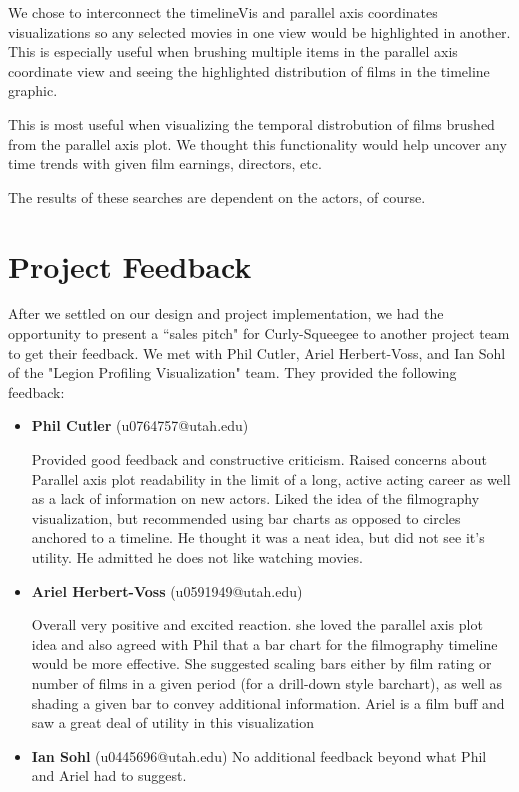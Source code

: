 \documentclass[12pt]{article}
\begin{document}
We chose to interconnect the timelineVis and parallel axis coordinates visualizations so any selected movies in one view would be highlighted in another.  This is especially useful when brushing multiple items in the parallel axis coordinate view and seeing the highlighted distribution of films in the timeline graphic.

This is most useful when visualizing the temporal distrobution of films brushed from the parallel axis plot.  We thought this functionality would help uncover any time trends with given film earnings, directors, etc.

The results of these searches are dependent on the actors, of course.

\newpage

\section{Project Feedback} \label{sec:Projcet Feedback}

After we settled on our design and project implementation, we had the opportunity to present a ``sales pitch"  for Curly-Squeegee to another project team to get their feedback.  We met with Phil Cutler, Ariel Herbert-Voss, and Ian Sohl of the "Legion Profiling Visualization" team. They provided the following feedback:

\begin{itemize}
	\item \textbf{Phil Cutler} (u0764757@utah.edu)
	
	Provided good feedback and constructive criticism. Raised concerns about Parallel axis plot readability in the limit of a long, active acting career as well as a lack of information on new actors. Liked the idea of the filmography visualization, but recommended using bar charts as opposed to circles anchored to a timeline. He thought it was a neat idea, but did not see it's utility. He admitted he does not like watching movies.
	
	
	\item \textbf{Ariel Herbert-Voss} (u0591949@utah.edu)
	
	Overall very positive and excited reaction. she loved the parallel axis plot idea and also agreed with Phil that a bar chart for the filmography timeline would be more effective. She suggested scaling bars either by film rating or number of films in a given period (for a drill-down style barchart), as well as shading a given bar to convey additional information. Ariel is a film buff and saw a great deal of utility in this visualization
	
	\item \textbf{Ian Sohl} (u0445696@utah.edu)
		No additional feedback beyond what Phil and Ariel had to suggest.
\end{itemize}
\end{document}
